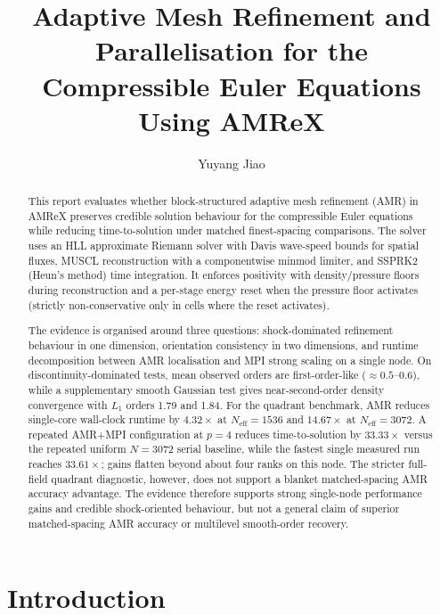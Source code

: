 \documentclass[final,3p,times,twocolumn]{elsarticle}
\begin{document}
\begin{frontmatter}

\title{Adaptive Mesh Refinement and Parallelisation for the Compressible Euler Equations Using AMReX}

\author{Yuyang Jiao}

\begin{abstract}
This report evaluates whether block-structured adaptive mesh refinement (AMR) in AMReX preserves credible solution behaviour for the compressible Euler equations while reducing time-to-solution under matched finest-spacing comparisons. The solver uses an HLL approximate Riemann solver with Davis wave-speed bounds for spatial fluxes, MUSCL reconstruction with a componentwise minmod limiter, and SSPRK2 (Heun's method) time integration. It enforces positivity with density/pressure floors during reconstruction and a per-stage energy reset when the pressure floor activates (strictly non-conservative only in cells where the reset activates).

The evidence is organised around three questions: shock-dominated refinement behaviour in one dimension, orientation consistency in two dimensions, and runtime decomposition between AMR localisation and MPI strong scaling on a single node. On discontinuity-dominated tests, mean observed orders are first-order-like ($\approx 0.5$--$0.6$), while a supplementary smooth Gaussian test gives near-second-order density convergence with $L_1$ orders 1.79 and 1.84. For the quadrant benchmark, AMR reduces single-core wall-clock runtime by $4.32\times$ at $N_\mathrm{eff}=1536$ and $14.67\times$ at $N_\mathrm{eff}=3072$. A repeated AMR+MPI configuration at $p=4$ reduces time-to-solution by $33.33\times$ versus the repeated uniform $N=3072$ serial baseline, while the fastest single measured run reaches $33.61\times$; gains flatten beyond about four ranks on this node. The stricter full-field quadrant diagnostic, however, does not support a blanket matched-spacing AMR accuracy advantage. The evidence therefore supports strong single-node performance gains and credible shock-oriented behaviour, but not a general claim of superior matched-spacing AMR accuracy or multilevel smooth-order recovery.
\end{abstract}

\end{frontmatter}


\section{Introduction}
\label{sec:introduction}
\end{document}
